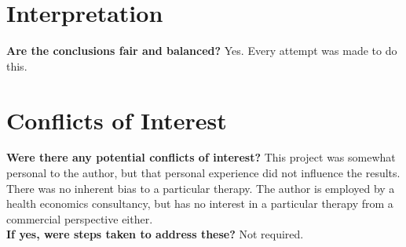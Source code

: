 \section{Interpretation}

\textbf{Are the conclusions fair and balanced?} Yes. Every attempt was made to do this. \\

\section{Conflicts of Interest}

\textbf{Were there any potential conflicts of interest?} This project was somewhat personal to the author, but that personal experience did not influence the results. There was no inherent bias to a particular therapy. The author is employed by a health economics consultancy, but has no interest in a particular therapy from a commercial perspective either.\\

\textbf{If yes, were steps taken to address these?} Not required.
